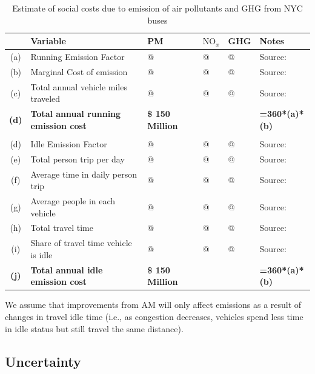 \documentclass[11pt, letterpaper]{article}
\begin{document}
\begin{enumerate}[leftmargin=*]
\begin{table}[h]
\caption{Estimate of social costs due to emission of air pollutants and GHG from NYC buses}
\vspace{0.2em}
\centering
\footnotesize 
\renewcommand{\arraystretch}{1.1}
\begin{tabular}{c p{10em} p{7em} p{7em} p{7em} l}
\hline
 	& Variable 							& PM 	& $\mbox{NO}_x$	& GHG		& Notes 						\\\hline\hline
(a)	& Running Emission Factor				& @		& @				& @			& Source:						\\
(b)	& Marginal Cost of emission				& @		& @				& @			& Source:						\\
(c)	& Total annual vehicle miles traveled			& @		& @				& @			& Source:						\\
\textbf{(d)}	& \textbf{Total annual running emission cost}		& \textbf{\$ 150 Million} & 		& 			& \textbf{=360*(a)*(b)}			\\
\\
(d)	& Idle Emission Factor					& @		& @				& @			& Source:						\\
(e)	& Total person trip per day					& @		& @				& @			& Source:						\\
(f)	& Average time in daily person trip			& @		& @				& @			& Source:						\\
(g)	& Average people in each vehicle			& @		& @				& @			& Source:						\\
(h)	& Total travel time						& @		& @				& @			& Source:						\\
(i)	& Share of travel time vehicle is idle			& @		& @				& @			& Source:						\\
\textbf{(j)}	& \textbf{Total annual idle emission cost}		& \textbf{\$ 150 Million} & 		& 			& \textbf{=360*(a)*(b)}			\\\hline
\end{tabular}
\label{tab:emission.cost}
\end{table}%
    
  We assume that improvements from AM will only affect emissions as a result of changes in travel idle time 
  (i.e., as congestion decreases, vehicles spend less time in idle status but still travel the same distance).
  
\end{enumerate}

\subsection{Uncertainty}
\end{document}

